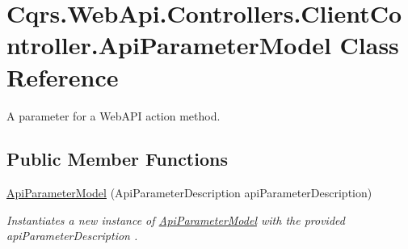 \hypertarget{classCqrs_1_1WebApi_1_1Controllers_1_1ClientController_1_1ApiParameterModel}{}\section{Cqrs.\+Web\+Api.\+Controllers.\+Client\+Controller.\+Api\+Parameter\+Model Class Reference}
\label{classCqrs_1_1WebApi_1_1Controllers_1_1ClientController_1_1ApiParameterModel}


A parameter for a Web\+A\+PI action method.  


\subsection*{Public Member Functions}
\begin{DoxyCompactItemize}
\item 
\hyperlink{classCqrs_1_1WebApi_1_1Controllers_1_1ClientController_1_1ApiParameterModel_a10222cdb87160250e4722834d8ebda3b_a10222cdb87160250e4722834d8ebda3b}{Api\+Parameter\+Model} (Api\+Parameter\+Description api\+Parameter\+Description)
\begin{DoxyCompactList}\small\item\em Instantiates a new instance of \hyperlink{classCqrs_1_1WebApi_1_1Controllers_1_1ClientController_1_1ApiParameterModel}{Api\+Parameter\+Model} with the provided {\itshape api\+Parameter\+Description} . \end{DoxyCompactList}\end{DoxyCompactItemize}
